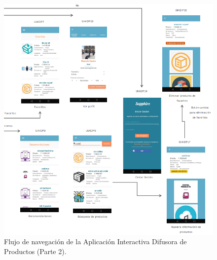 \FloatBarrier
\FloatBarrier
\begin{figure}[htbp!]
		\centering
			\includegraphics[width=1 \textwidth]{imagenes/mapaNavNuevoP2}
		\caption{Flujo de navegación de la Aplicación Interactiva Difusora de Productos (Parte 2).}
		\label{image:map3}
\end{figure}
\FloatBarrier
\FloatBarrier
